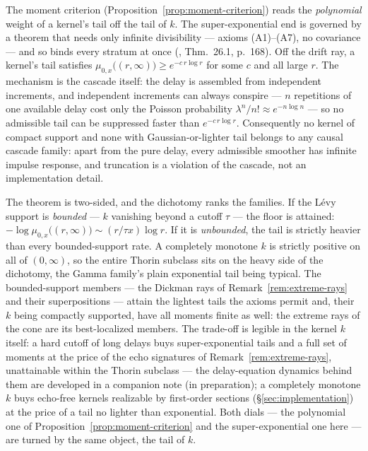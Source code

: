\begin{remark}\label{rem:tail-dichotomy}
The moment criterion (Proposition~\ref{prop:moment-criterion}) reads the
\emph{polynomial} weight of a kernel's tail off the tail of $k$. The
super-exponential end is governed by a theorem that needs only infinite divisibility
--- axioms (A1)--(A7), no covariance --- and so binds every stratum at once
(, Thm.~26.1, p.~168). Off the drift ray, a kernel's tail
satisfies $\mu_{0,x}\bigl((r,\infty)\bigr) \ge e^{-c\,r\log r}$ for some $c$ and all
large $r$. The mechanism is the cascade itself: the delay is assembled from
independent increments, and independent increments can always conspire --- $n$
repetitions of one available delay cost only the Poisson probability
$\lambda^n/n! \approx e^{-n\log n}$ --- so no admissible tail can be suppressed
faster than $e^{-c\,r\log r}$. Consequently no kernel of compact support and none
with Gaussian-or-lighter tail belongs to any causal cascade family: apart from the
pure delay, every admissible smoother has infinite impulse response, and truncation
is a violation of the cascade, not an implementation detail.

The theorem is two-sided, and the dichotomy ranks the families. If the Lévy support
is \emph{bounded} --- $k$ vanishing beyond a cutoff $\tau$ --- the floor is
attained: $-\log \mu_{0,x}\bigl((r,\infty)\bigr) \sim (r/\tau x)\log r$. If it is
\emph{unbounded}, the tail is strictly heavier than every bounded-support rate. A
completely monotone $k$ is strictly positive on all of $(0,\infty)$, so the entire
Thorin subclass sits on the heavy side of the dichotomy, the Gamma family's plain
exponential tail being typical. The bounded-support members --- the Dickman rays of
Remark~\ref{rem:extreme-rays} and their superpositions --- attain the lightest
tails the axioms permit and, their $k$ being compactly supported, have all moments
finite as well: the extreme rays of the cone are its best-localized members. The
trade-off is legible in the kernel $k$ itself: a hard cutoff of long delays buys
super-exponential tails and a full set of moments at the price of the echo
signatures of Remark~\ref{rem:extreme-rays}, unattainable within the Thorin
subclass --- the delay-equation dynamics behind them are developed in a companion
note (in preparation); a completely monotone $k$ buys echo-free kernels realizable by
first-order sections (\S\ref{sec:implementation}) at the price of a tail no lighter
than exponential. Both dials --- the polynomial one of
Proposition~\ref{prop:moment-criterion} and the super-exponential one here --- are
turned by the same object, the tail of $k$.
\end{remark}

